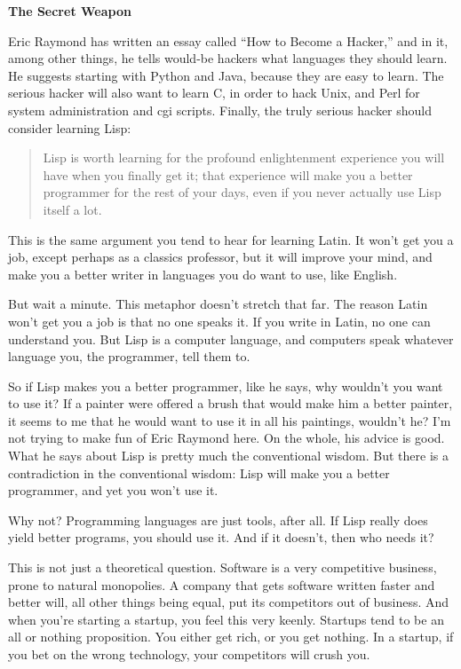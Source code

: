 \documentclass[12pt]{book}
\begin{document}
\textbf{The Secret Weapon}

Eric Raymond has written an essay called ``How to Become a Hacker,'' and
in it, among other things, he tells would-be hackers what languages they
should learn. He suggests starting with Python and Java, because they
are easy to learn. The serious hacker will also want to learn C, in
order to hack Unix, and Perl for system administration and cgi scripts.
Finally, the truly serious hacker should consider learning Lisp:

\begin{quote}
Lisp is worth learning for the profound enlightenment experience you
will have when you finally get it; that experience will make you a
better programmer for the rest of your days, even if you never actually
use Lisp itself a lot.
\end{quote}

This is the same argument you tend to hear for learning Latin. It won't
get you a job, except perhaps as a classics professor, but it will
improve your mind, and make you a better writer in languages you do want
to use, like English.

But wait a minute. This metaphor doesn't stretch that far. The reason
Latin won't get you a job is that no one speaks it. If you write in
Latin, no one can understand you. But Lisp is a computer language, and
computers speak whatever language you, the programmer, tell them to.

So if Lisp makes you a better programmer, like he says, why wouldn't you
want to use it? If a painter were offered a brush that would make him a
better painter, it seems to me that he would want to use it in all his
paintings, wouldn't he? I'm not trying to make fun of Eric Raymond here.
On the whole, his advice is good. What he says about Lisp is pretty much
the conventional wisdom. But there is a contradiction in the
conventional wisdom: Lisp will make you a better programmer, and yet you
won't use it.

Why not? Programming languages are just tools, after all. If Lisp really
does yield better programs, you should use it. And if it doesn't, then
who needs it?

This is not just a theoretical question. Software is a very competitive
business, prone to natural monopolies. A company that gets software
written faster and better will, all other things being equal, put its
competitors out of business. And when you're starting a startup, you
feel this very keenly. Startups tend to be an all or nothing
proposition. You either get rich, or you get nothing. In a startup, if
you bet on the wrong technology, your competitors will crush you.
\end{document}
